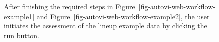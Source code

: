 \documentclass[
doublespace,
  times]{anzsauth}
\begin{document}
\begin{figure}


\caption{\label{fig-autovi-web-workflow-example3}After finishing the
required steps in Figure~\ref{fig-autovi-web-workflow-example1} and
Figure~\ref{fig-autovi-web-workflow-example2}, the user initiates the
assessment of the lineup example data by clicking the run button.}

\end{figure}%
\end{document}
